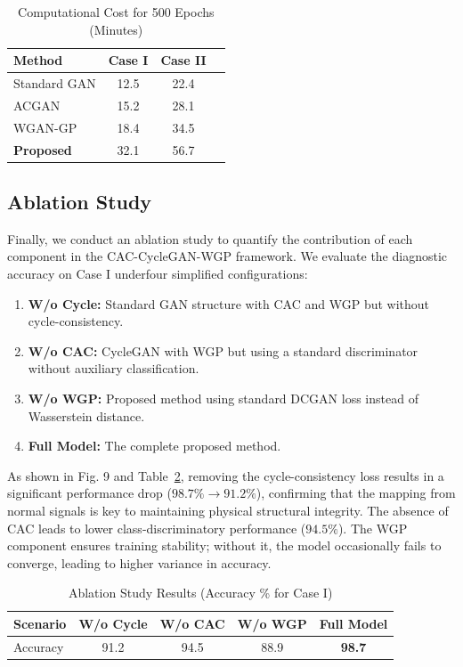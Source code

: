 \begin{table}[htbp]
\centering
\caption{Computational Cost for 500 Epochs (Minutes)}
\label{tab:comp_cost}
\begin{tabular}{lccc}
\hline
\textbf{Method} & \textbf{Case I} & \textbf{Case II} \\ \hline
Standard GAN & 12.5 & 22.4 \\
ACGAN & 15.2 & 28.1 \\
WGAN-GP & 18.4 & 34.5 \\
\textbf{Proposed} & 32.1 & 56.7 \\
\hline
\end{tabular}
\end{table}

\subsection{Ablation Study}
Finally, we conduct an ablation study to quantify the contribution of each component in the CAC-CycleGAN-WGP framework. We evaluate the diagnostic accuracy on Case I underfour simplified configurations:
\begin{enumerate}
    \item \textbf{W/o Cycle:} Standard GAN structure with CAC and WGP but without cycle-consistency.
    \item \textbf{W/o CAC:} CycleGAN with WGP but using a standard discriminator without auxiliary classification.
    \item \textbf{W/o WGP:} Proposed method using standard DCGAN loss instead of Wasserstein distance.
    \item \textbf{Full Model:} The complete proposed method.
\end{enumerate}

As shown in Fig. 9 and Table~\ref{tab:ablation}, removing the cycle-consistency loss results in a significant performance drop ($98.7\% \to 91.2\%$), confirming that the mapping from normal signals is key to maintaining physical structural integrity. The absence of CAC leads to lower class-discriminatory performance ($94.5\%$). The WGP component ensures training stability; without it, the model occasionally fails to converge, leading to higher variance in accuracy.

\begin{table}[htbp]
\centering
\caption{Ablation Study Results (Accuracy \% for Case I)}
\label{tab:ablation}
\begin{tabular}{lcccc}
\hline
\textbf{Scenario} & W/o Cycle & W/o CAC & W/o WGP & \textbf{Full Model} \\ \hline
Accuracy & 91.2 & 94.5 & 88.9 & \textbf{98.7} \\
\hline
\end{tabular}
\end{table}

